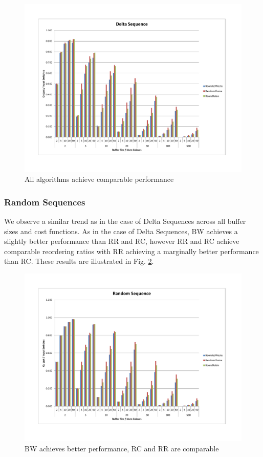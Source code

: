 \begin{figure}[ht]
\centering 
\includegraphics[scale=0.60]{Delta-Uniform.pdf}
\caption{All algorithms achieve comparable performance}
\label{deltaUniform}
\end{figure}

\subsubsection{Random Sequences}

We observe a similar trend as in the case of Delta Sequences across all buffer sizes and cost functions. As in the case of Delta Sequences, BW achieves a slightly better performance than RR and RC, however RR and RC achieve comparable reordering ratios with RR achieving a marginally better performance than RC. These results are illustrated in Fig. \ref{randomUniform}.

\begin{figure}[ht]
\centering 
\includegraphics[scale=0.60]{Random-Uniform.pdf}
\caption{BW achieves better performance, RC and RR are comparable}
\label{randomUniform}
\end{figure}

